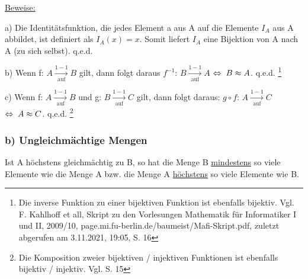 \documentclass[12pt]{article}
\begin{document}
		\bigskip
		
		\underline{Beweise:}
		
		a) Die Identitätsfunktion, die jedes Element a aus A auf die Elemente $I_A$ aus A 
		abbildet, ist definiert als $I_A(x) = x$.
		Somit liefert $I_A$ eine Bijektion von A nach A (zu sich selbst). \hspace*{2mm} q.e.d.
		
		b) Wenn f: $A \xrightarrow[\text{auf}]{1-1} B$ gilt, dann folgt daraus $f^{-1}$: $B 
		\xrightarrow[\text{auf}]{1-1} A$ \hspace*{1mm}$\Leftrightarrow \hspace*{1mm} B \approx A$. \hspace*{2mm} q.e.d.
		\footnote{
			Die inverse Funktion zu einer bijektiven Funktion ist ebenfalls bijektiv.
			Vgl. F. Kahlhoff et all, Skript zu den Vorlesungen Mathematik für Informatiker I und II, 2009/10, 
			page.mi.fu-berlin.de/baumeist/Mafi-Skript.pdf, zuletzt abgerufen am 3.11.2021, 19:05, S. 16
		}
		
		c) Wenn f: $A \xrightarrow[\text{auf}]{1-1} B$ und g: $B \xrightarrow[\text{auf}]{1-1} C$ gilt, dann
		folgt daraus: $g \circ f$: $A \xrightarrow[\text{auf}]{1-1} C$ \hspace*{1mm}$\Leftrightarrow \hspace*{1mm} A \approx C$. \hspace*{2mm} q.e.d.
		\footnote{
			Die Komposition zweier bijektiven / injektiven Funktionen ist ebenfalls bijektiv / injektiv. Vgl. S. 15
		}
		
		\subsubsection*{b) Ungleichmächtige Mengen}
		
		
		Ist A höchstens gleichmächtig zu B, so hat die Menge B \underline{mindestens}
		so viele Elemente wie die Menge A bzw. die Menge A \underline{höchstens} so viele
		Elemente wie B.
		
\end{document}

